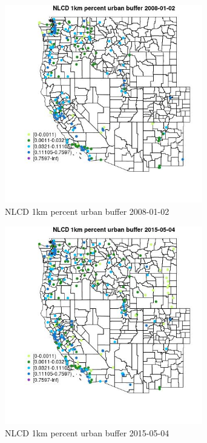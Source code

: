 \begin{figure} 
\centering  
\includegraphics[width=0.77\textwidth]{Code_Outputs/Report_ML_input_PM25_Step4_part_e_de_duplicated_aves_compiled_2019-05-18wNAs_MapObsNLCD_1km_percent_urban_buffer2008-01-02.jpg} 
\caption{\label{fig:Report_ML_input_PM25_Step4_part_e_de_duplicated_aves_compiled_2019-05-18wNAsMapObsNLCD_1km_percent_urban_buffer2008-01-02}NLCD 1km percent urban buffer 2008-01-02} 
\end{figure} 
 

\begin{figure} 
\centering  
\includegraphics[width=0.77\textwidth]{Code_Outputs/Report_ML_input_PM25_Step4_part_e_de_duplicated_aves_compiled_2019-05-18wNAs_MapObsNLCD_1km_percent_urban_buffer2015-05-04.jpg} 
\caption{\label{fig:Report_ML_input_PM25_Step4_part_e_de_duplicated_aves_compiled_2019-05-18wNAsMapObsNLCD_1km_percent_urban_buffer2015-05-04}NLCD 1km percent urban buffer 2015-05-04} 
\end{figure} 
 

